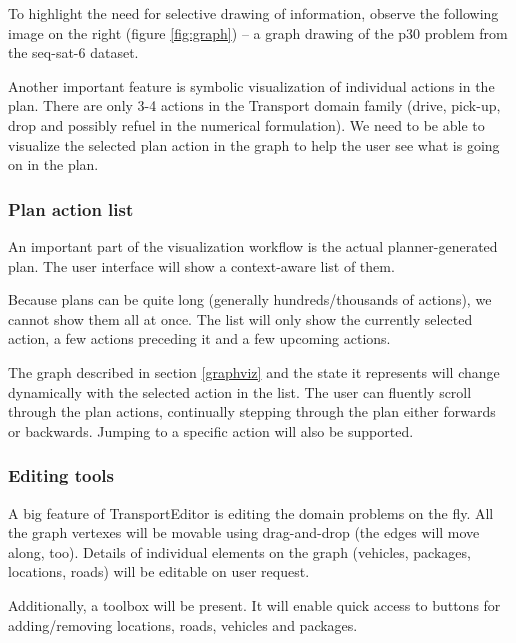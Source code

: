 \documentclass[10pt,a4paper,oneside]{article}
\newcommand{\pname}{TransportEditor} %
\begin{document}
To highlight the need for selective drawing of information, observe the following image on the right (figure \ref{fig:graph}) -- a graph drawing of the p30 problem from the seq-sat-6 dataset.

Another important feature is symbolic visualization of individual actions in the plan.
There are only 3-4 actions in the Transport domain family (drive, pick-up, drop and possibly refuel in the numerical formulation).
We need to be able to visualize the selected plan action in the graph to help the user see what is going on in the plan.


\subsubsection{Plan action list}

An important part of the visualization workflow is the actual planner-generated plan.
The user interface will show a context-aware list of them.

Because plans can be quite long (generally hundreds/thousands of actions),
we cannot show them all at once.
The list will only show the currently selected action, a few actions preceding it and a few upcoming actions.

The graph described in section \ref{graphviz} and the state it represents will change dynamically with the selected action in the list. The user can fluently scroll through the plan actions, continually stepping through the plan either forwards or backwards.
Jumping to a specific action will also be supported.

\subsubsection{Editing tools}

A big feature of \pname{} is editing the domain problems on the fly.
All the graph vertexes will be movable using drag-and-drop (the edges will move along, too).
Details of individual elements on the graph (vehicles, packages, locations, roads) will be editable
on user request.

Additionally, a toolbox will be present. It will enable quick access to buttons for adding/removing locations, roads, vehicles and packages.
\end{document}
